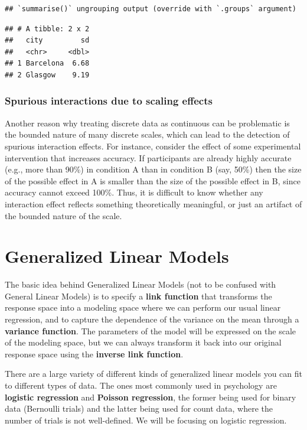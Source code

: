 \documentclass[]{book}
\begin{document}
\begin{verbatim}
## `summarise()` ungrouping output (override with `.groups` argument)
\end{verbatim}

\begin{verbatim}
## # A tibble: 2 x 2
##   city         sd
##   <chr>     <dbl>
## 1 Barcelona  6.68
## 2 Glasgow    9.19
\end{verbatim}

\hypertarget{spurious-interactions-due-to-scaling-effects}{%
\subsubsection{Spurious interactions due to scaling effects}\label{spurious-interactions-due-to-scaling-effects}}

Another reason why treating discrete data as continuous can be problematic is the bounded nature of many discrete scales, which can lead to the detection of spurious interaction effects. For instance, consider the effect of some experimental intervention that increases accuracy. If participants are already highly accurate (e.g., more than 90\%) in condition A than in condition B (say, 50\%) then the size of the possible effect in A is smaller than the size of the possible effect in B, since accuracy cannot exceed 100\%. Thus, it is difficult to know whether any interaction effect reflects something theoretically meaningful, or just an artifact of the bounded nature of the scale.

\hypertarget{generalized-linear-models}{%
\section{Generalized Linear Models}\label{generalized-linear-models}}

The basic idea behind Generalized Linear Models (not to be confused with General Linear Models) is to specify a \textbf{link function} that transforms the response space into a modeling space where we can perform our usual linear regression, and to capture the dependence of the variance on the mean through a \textbf{variance function}. The parameters of the model will be expressed on the scale of the modeling space, but we can always transform it back into our original response space using the \textbf{inverse link function}.

There are a large variety of different kinds of generalized linear models you can fit to different types of data. The ones most commonly used in psychology are \textbf{logistic regression} and \textbf{Poisson regression}, the former being used for binary data (Bernoulli trials) and the latter being used for count data, where the number of trials is not well-defined. We will be focusing on logistic regression.
\end{document}
